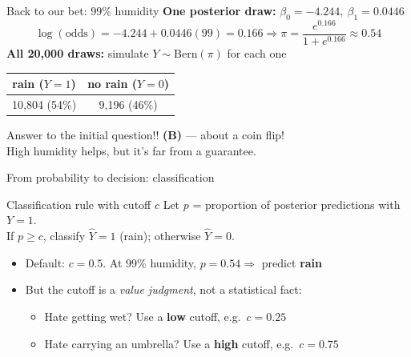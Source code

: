 \documentclass[aspectratio=43,11pt]{beamer}
\newcommand{\hl}[1]{\textcolor{warm}{\textbf{#1}}}
\begin{document}
\begin{frame}{Back to our bet: 99\% humidity}
  \textbf{One posterior draw:} $\beta_0 = -4.244,\ \beta_1 = 0.0446$
  \[
    \log(\text{odds}) = -4.244 + 0.0446(99) = 0.166
    \Rightarrow \pi = \frac{e^{0.166}}{1+e^{0.166}} \approx 0.54
  \]
  \textbf{All 20{,}000 draws:} simulate $Y \sim \text{Bern}(\pi)$ for each one
  \begin{center}
    \begin{tabular}{cc}
      \toprule
      rain ($Y=1$) & no rain ($Y=0$)\\ \midrule
      10{,}804 \;(54\%) & 9{,}196 \;(46\%)\\ \bottomrule
    \end{tabular}
  \end{center}
  \vspace{0.3em}
  \begin{alertblock}{Answer to the initial question!!}
    \textbf{(B)} --- about a coin flip!\\
    High humidity helps, but it's far from a guarantee.
  \end{alertblock}
\end{frame}

\begin{frame}{From probability to decision: classification}
  \begin{block}{Classification rule with cutoff $c$}
    Let $p$ = proportion of posterior predictions with $Y = 1$.\\[0.2em]
    \centering If $p \ge c$, classify $\hat Y = 1$ (rain); \; otherwise $\hat Y = 0$.
  \end{block}
  \vspace{0.6em}
  \begin{itemize}
    \setlength\itemsep{0.5em}
    \item Default: $c = 0.5$. At 99\% humidity, $p = 0.54 \Rightarrow$ predict \hl{rain}
    \item But the cutoff is a \emph{value judgment}, not a statistical fact:
    \begin{itemize}
      \item Hate getting wet? Use a \hl{low} cutoff, e.g.\ $c = 0.25$
      \item Hate carrying an umbrella? Use a \hl{high} cutoff, e.g.\ $c = 0.75$
    \end{itemize}
  \end{itemize}
\end{frame}
\end{document}
